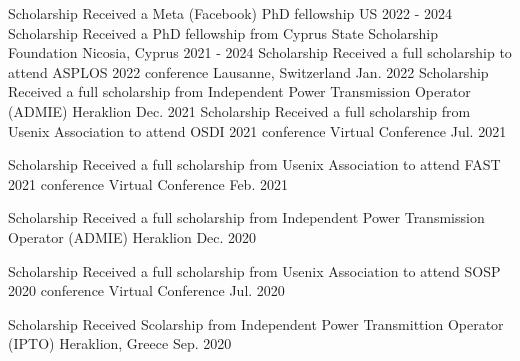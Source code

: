 
\begin{cvhonors}
  \cvhonor
    {Scholarship} %
	{Received a Meta (Facebook) PhD fellowship} %
    {US} %
    {2022 - 2024} %
  \cvhonor
    {Scholarship} %
	{Received a PhD fellowship from Cyprus State Scholarship Foundation} %
    {Nicosia, Cyprus} %
    {2021 - 2024} %
  \cvhonor
    {Scholarship} %
	{Received a full scholarship to attend ASPLOS 2022 conference} %
    {Lausanne, Switzerland} %
    {Jan. 2022} %
  \cvhonor
    {Scholarship} %
	{Received a full scholarship from Independent Power Transmission
	Operator (ADMIE)} %
    {Heraklion} %
    {Dec. 2021} %
  \cvhonor
    {Scholarship} %
	{Received a full scholarship from Usenix Association to attend
	OSDI 2021 conference} %
    {Virtual Conference} %
    {Jul. 2021} %

  \cvhonor
    {Scholarship} %
	{Received a full scholarship from Usenix Association to attend
	FAST 2021 conference
	} %
    {Virtual Conference} %
    {Feb. 2021} %

  \cvhonor
    {Scholarship} %
	{Received a full scholarship from Independent Power Transmission
	Operator (ADMIE)} %
    {Heraklion} %
    {Dec. 2020} %

  \cvhonor
    {Scholarship} %
	{Received a full scholarship from Usenix Association to attend
	SOSP 2020 conference} %
    {Virtual Conference} %
    {Jul. 2020} %

  \cvhonor
    {Scholarship} %
	{Received Scolarship from Independent Power Transmittion Operator
	(IPTO)} %
    {Heraklion, Greece} %
    {Sep. 2020} %


\end{cvhonors}
